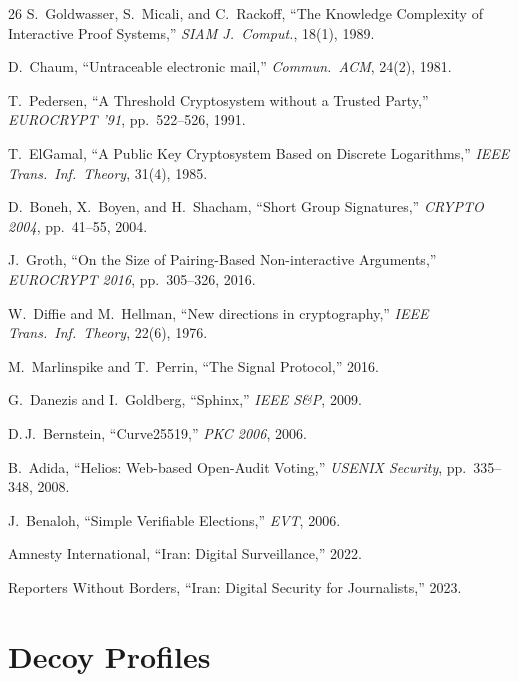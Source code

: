 \documentclass[11pt,a4paper]{article}
\begin{document}
\begin{thebibliography}{26}
S.~Goldwasser, S.~Micali, and C.~Rackoff,
``The Knowledge Complexity of Interactive Proof Systems,''
\emph{SIAM J.\ Comput.}, 18(1), 1989.

D.~Chaum,
``Untraceable electronic mail,''
\emph{Commun.\ ACM}, 24(2), 1981.

T.~Pedersen,
``A Threshold Cryptosystem without a Trusted Party,''
\emph{EUROCRYPT '91}, pp.~522--526, 1991.

T.~ElGamal,
``A Public Key Cryptosystem Based on Discrete Logarithms,''
\emph{IEEE Trans.\ Inf.\ Theory}, 31(4), 1985.

D.~Boneh, X.~Boyen, and H.~Shacham,
``Short Group Signatures,''
\emph{CRYPTO 2004}, pp.~41--55, 2004.

J.~Groth,
``On the Size of Pairing-Based Non-interactive Arguments,''
\emph{EUROCRYPT 2016}, pp.~305--326, 2016.

W.~Diffie and M.~Hellman,
``New directions in cryptography,''
\emph{IEEE Trans.\ Inf.\ Theory}, 22(6), 1976.

M.~Marlinspike and T.~Perrin,
``The Signal Protocol,''
2016.

G.~Danezis and I.~Goldberg,
``Sphinx,''
\emph{IEEE S\&P}, 2009.

D.\,J.~Bernstein,
``Curve25519,''
\emph{PKC 2006}, 2006.

B.~Adida,
``Helios: Web-based Open-Audit Voting,''
\emph{USENIX Security}, pp.~335--348, 2008.

J.~Benaloh,
``Simple Verifiable Elections,''
\emph{EVT}, 2006.

Amnesty International,
``Iran: Digital Surveillance,''
2022.

Reporters Without Borders,
``Iran: Digital Security for Journalists,''
2023.

\end{thebibliography}

\appendix

\section{Decoy Profiles}
\label{app:profiles}
\end{document}
